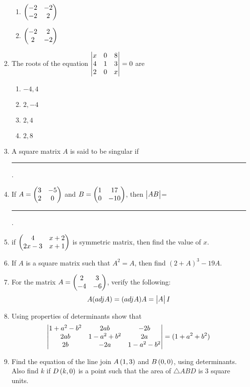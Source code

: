 \begin{enumerate}
\begin{enumerate}
		\item $\begin{pmatrix}-2&-2\\-2&2\end{pmatrix}$
		\item $\begin{pmatrix}-2&2\\2&-2\end{pmatrix}$
	\end{enumerate}
\item The roots of the equation $\begin{vmatrix}x&0&8\\4&1&3\\2&0&x\end{vmatrix}=0$ are
	\begin{enumerate}
		\item $-4,4$
		\item $2,-4$
		\item $2,4$
		\item $2,8$
	\end{enumerate}
\item A square matrix $A$ is said to be singular if \rule{2cm}{0.15mm}.
\item If $A= \begin{pmatrix}3&-5\\2&0\end{pmatrix}$ and $B=\begin{pmatrix}1&17\\0&-10\end{pmatrix}$, then $\begin{vmatrix}AB\end{vmatrix}$= \rule{2cm}{0.15mm}.
\item if $\begin{pmatrix}4&x+2\\2x-3&x+1\end{pmatrix}$ is symmetric matrix, then find the value of $x$.
\item If $A$ is a square matrix such that $A^2=A$, then find $(2+A)^3 -19A$.
\item For the matrix $A=\begin{pmatrix}2&3\\-4&-6\end{pmatrix}$, verify the following:
	\begin{align}
		A(adj A) = (adj A)A= \begin{vmatrix}A\end{vmatrix}I
	\end{align}
\item Using properties of determinants show that
	\begin{align}
		\begin{vmatrix}1+a^2-b^2 & 2ab & -2b \\ 2ab & 1-a^2+b^2 & 2a \\ 2b & -2a & 1-a^2-b^2\end{vmatrix} = (1+a^2+b^2)
	\end{align}
\item Find the equation of the line join $A\left(1, 3\right)$ and $B\left(0, 0\right)$, using determinants. Also find $k$ if $D\left(k,0\right)$ is a point such that the area of $\triangle ABD$ is $3$ square units.
\end{enumerate}
